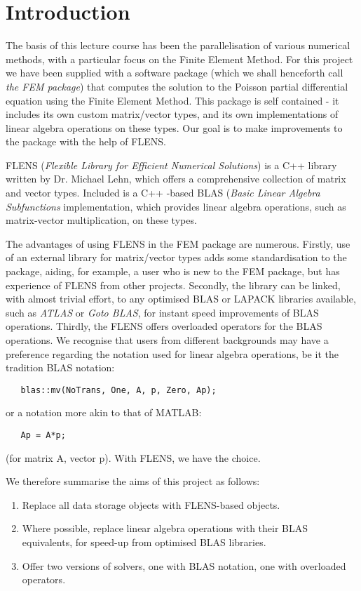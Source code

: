 \setcounter{section}{-1}
\section{Introduction}

The basis of this lecture course has been the parallelisation of various numerical methods, with a particular focus on the Finite Element Method. For this project we have been supplied with a software package (which we shall henceforth call \emph{the FEM package}) that computes the solution to the Poisson partial differential equation using the Finite Element Method. This package is self contained - it includes its own custom matrix/vector types, and its own implementations of linear algebra operations on these types. Our goal is to make improvements to the package with the help of FLENS.

FLENS (\emph{Flexible Library for Efficient Numerical Solutions}) is a C++ library written by Dr. Michael Lehn, which offers a comprehensive collection of matrix and vector types. Included is a C++ -based BLAS (\emph{Basic Linear Algebra Subfunctions} implementation, which provides linear algebra operations, such as matrix-vector multiplication, on these types. 

The advantages of using FLENS in the FEM package are numerous. Firstly, use of an external library for matrix/vector types adds some standardisation to the package, aiding, for example, a user who is new to the FEM package, but has experience of FLENS from other projects. Secondly, the library can be linked, with almost trivial effort, to any optimised BLAS or LAPACK libraries available, such as \emph{ATLAS} or \emph{Goto BLAS}, for instant speed improvements of BLAS operations. Thirdly, the FLENS offers overloaded operators for the BLAS operations. We recognise that users from different backgrounds may have a preference regarding the notation used for linear algebra operations, be it the tradition BLAS notation:
\begin{lstlisting}
   blas::mv(NoTrans, One, A, p, Zero, Ap);
\end{lstlisting}
or a notation more akin to that of MATLAB:
\begin{lstlisting}
   Ap = A*p;
\end{lstlisting}
(for matrix A, vector p). With FLENS, we have the choice.

We therefore summarise the aims of this project as follows:
\begin{enumerate}
   \item Replace all data storage objects with FLENS-based objects.
   \item Where possible, replace linear algebra operations with their BLAS equivalents, for speed-up from optimised BLAS libraries.
   \item Offer two versions of solvers, one with BLAS notation, one with overloaded operators.
\end{enumerate}

